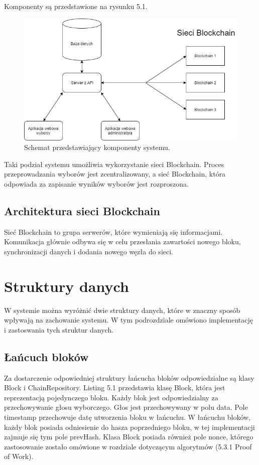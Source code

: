 \documentclass[a4paper,12pt]{book}
\begin{document}
Komponenty są przedstawione na rysunku 5.1.

\begin{figure}[h]
    	\centering
	\includegraphics[width=\textwidth]{images/modules.png}
	\caption{Schemat przedstawiający komponenty systemu.}
\end {figure}

Taki podział systemu umożliwia wykorzystanie sieci Blockchain. Proces przeprowadzania wyborów jest zcentralizowany, a sieć Blockchain, która odpowiada za zapisanie wyników wyborów jest rozproszona.

\subsection{Architektura sieci Blockchain}

Sieć Blockchain to grupa serwerów, które wymieniają się informacjami. Komunikacja głównie odbywa się w celu przesłania zawartości nowego bloku, synchronizacji danych i dodania nowego węzła do sieci.

\section{Struktury danych}

W systemie można wyróżnić dwie struktury danych, które w znaczny sposób wpływają na zachowanie systemu. W tym podrozdziale omówiono implementację i zastoswania tych struktur danych.

\newpage

\subsection{Łańcuch bloków}

Za dostarczenie odpowiedniej struktury łańcucha bloków odpowiedzialne są klasy Block i ChainRepository. Listing 5.1 przedstawia klasę Block, która jest reprezentacją pojedynczego bloku. Każdy blok jest odpowiedzialny za przechowywanie głosu wyborczego. Głos jest przechowywany w polu data. Pole timestamp przechowuje datę utworzenia bloku w łańcuchu. W łańcuchu bloków, każdy blok posiada odniesienie do hasza poprzedniego bloku, w tej implementacji zajmuje się tym pole prevHash. Klasa Block posiada również pole nonce, którego zastosowanie zostało omówione w rozdziale dotyczącym algorytmów (5.3.1 Proof of Work).
\end{document}
